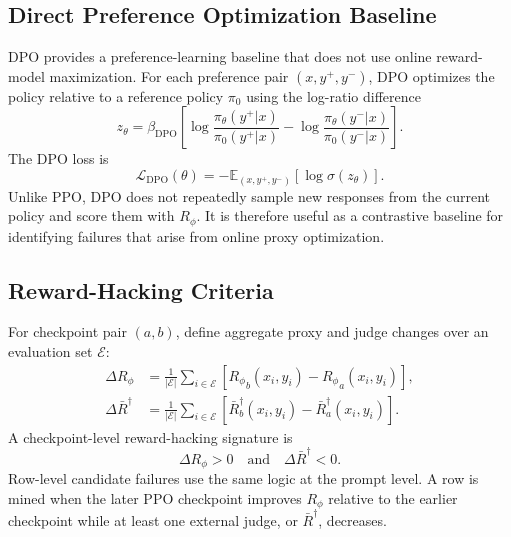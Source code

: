 \documentclass[twocolumn,10pt]{article}
\newcommand{\Rphi}{R_{\phi}}
\begin{document}
\subsection{Direct Preference Optimization Baseline}
DPO provides a preference-learning baseline that does not use online reward-model maximization. For each preference pair $(x,y^+,y^-)$, DPO optimizes the policy relative to a reference policy $\pi_0$ using the log-ratio difference
\begin{equation}
    z_\theta = \beta_{\mathrm{DPO}}
    \left[
    \log\frac{\pi_\theta(y^+|x)}{\pi_0(y^+|x)}
    -
    \log\frac{\pi_\theta(y^-|x)}{\pi_0(y^-|x)}
    \right].
\end{equation}
The DPO loss is
\begin{equation}
    \mathcal{L}_{\mathrm{DPO}}(\theta)
    =-\mathbb{E}_{(x,y^+,y^-)}\left[\log\sigma(z_\theta)\right].
\end{equation}
Unlike PPO, DPO does not repeatedly sample new responses from the current policy and score them with $\Rphi$. It is therefore useful as a contrastive baseline for identifying failures that arise from online proxy optimization.

\subsection{Reward-Hacking Criteria}
For checkpoint pair $(a,b)$, define aggregate proxy and judge changes over an evaluation set $\mathcal{E}$:
\begin{align}
    \Delta \Rphi &= \frac{1}{|\mathcal{E}|}\sum_{i\in\mathcal{E}}
    \left[{\Rphi}_b(x_i,y_i)-{\Rphi}_a(x_i,y_i)\right],\\
    \Delta \bar R^\dagger &= \frac{1}{|\mathcal{E}|}\sum_{i\in\mathcal{E}}
    \left[\bar R^\dagger_b(x_i,y_i)-\bar R^\dagger_a(x_i,y_i)\right].
\end{align}
A checkpoint-level reward-hacking signature is
\begin{equation}
    \Delta \Rphi>0 \quad \text{and} \quad \Delta \bar R^\dagger<0.
\end{equation}
Row-level candidate failures use the same logic at the prompt level. A row is mined when the later PPO checkpoint improves $\Rphi$ relative to the earlier checkpoint while at least one external judge, or $\bar R^\dagger$, decreases.
\end{document}
